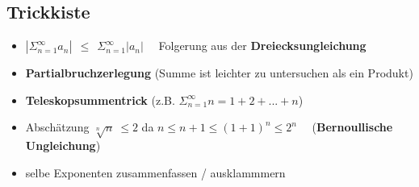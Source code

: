 \documentclass[a4paper,12pt]{article} %
\begin{document}
\subsection{Trickkiste}
\begin{itemize}
\item $|\Sigma_{n=1}^{\infty}a_n| \ \ \leq \ \ \Sigma_{n=1}^{\infty} |a_n|$ \ \ Folgerung aus der \textbf{Dreiecksungleichung}
\item \textbf{Partialbruchzerlegung} (Summe ist leichter zu untersuchen als ein Produkt)
\item \textbf{Teleskopsummentrick} (z.B. $\Sigma_{n=1}^{\infty}n = 1+2+...+n$)
\item Abschätzung $\sqrt[n]{n} \ \leq 2$ da $n \leq n+1 \leq (1+1)^n \leq 2^n$ \ \ (\textbf{Bernoullische Ungleichung})
\item selbe Exponenten zusammenfassen / ausklammmern
\end{itemize}
\newpage
\end{document}
